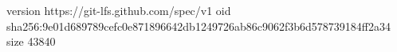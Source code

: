 version https://git-lfs.github.com/spec/v1
oid sha256:9e01d689789cefc0e871896642db1249726ab86c9062f3b6d578739184ff2a34
size 43840
